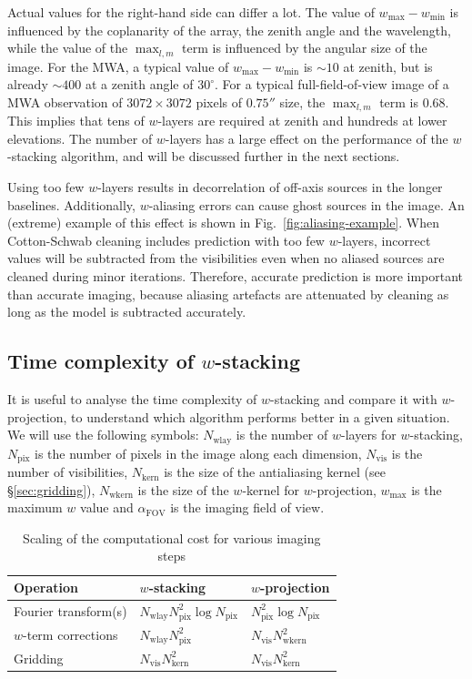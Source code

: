 \documentclass[useAMS,usenatbib]{mn2e}
\begin{document}
Actual values for the right-hand side can differ a lot. The value of $w_{\max} - w_{\min}$ is influenced by the coplanarity of the array, the zenith angle and the wavelength, while the value of the $\max_{l,m}$ term is influenced by the angular size of the image. For the MWA, a typical value of $w_{\max} - w_{\min}$ is $\sim 10$ at zenith, but is already $\sim 400$ at a zenith angle of $30^{\circ}$. For a typical full-field-of-view image of a MWA observation of $3072\times 3072$ pixels of $0.75''$ size, the $\max_{l,m}$ term is $0.68$. This implies that tens of $w$-layers are required at zenith and hundreds at lower elevations. The number of $w$-layers has a large effect on the performance of the $w$-stacking algorithm, and will be discussed further in the next sections.

Using too few $w$-layers results in decorrelation of off-axis sources in the longer baselines. Additionally, $w$-aliasing errors can cause ghost sources in the image. An (extreme) example of this effect is shown in Fig.~\ref{fig:aliasing-example}. When Cotton-Schwab cleaning includes prediction with too few $w$-layers, incorrect values will be subtracted from the visibilities even when no aliased sources are cleaned during minor iterations. Therefore, accurate prediction is more important than accurate imaging, because aliasing artefacts are attenuated by cleaning as long as the model is subtracted accurately.

\subsection{Time complexity of $w$-stacking} \label{sec:time-complexity}
It is useful to analyse the time complexity of $w$-stacking and compare it with $w$-projection, to understand which algorithm performs better in a given situation. We will use the following symbols: $N_\textrm{wlay}$ is the number of $w$-layers for $w$-stacking, $N_\textrm{pix}$ is the number of pixels in the image along each dimension, $N_\textrm{vis}$ is the number of visibilities, $N_\textrm{kern}$ is the size of the antialiasing kernel (see \S\ref{sec:gridding}), $N_\textrm{wkern}$ is the size of the $w$-kernel for $w$-projection, $w_{\max}$ is the maximum $w$ value and $\alpha_\textrm{FOV}$ is the imaging field of view.

\begin{table}
 \caption{Scaling of the computational cost for various imaging steps} \label{tbl:computational-cost-per-operation}
 \begin{tabular}{lll}
   \textbf{Operation} & \textbf{$w$-stacking} & \textbf{$w$-projection} \\
   \hline\hline
   Fourier transform(s) & $N_\textrm{wlay} N^2_\textrm{pix} \log N_\textrm{pix}$ & $N^2_\textrm{pix} \log N_\textrm{pix}$ \\
   $w$-term corrections   & $N_\textrm{wlay} N^2_\textrm{pix}$ & $N_\textrm{vis} N^2_\textrm{wkern}$ \\
   Gridding & $N_\textrm{vis}N^2_\textrm{kern}$ & $N_\textrm{vis} N_\textrm{kern}^2$ \\
   \hline\hline
 \end{tabular}
\end{table}
\end{document}
